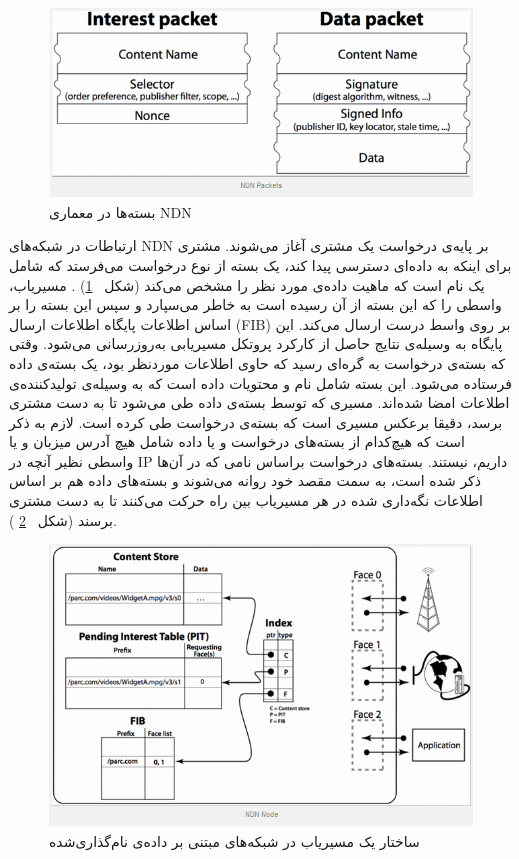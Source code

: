 \begin{figure}[H]
\centering
\includegraphics[scale=0.6]{./resources/figures/3_NDNpackets.png}
\caption{بسته‌ها در معماری NDN}
\label{fig:packets}
\end{figure}




ارتباطات در شبکه‌های NDN بر پایه‌ی درخواست یک مشتری آغاز می‌شوند. مشتری برای اینکه به داده‌ای دسترسی پیدا کند، یک بسته از نوع درخواست می‌فرستد که شامل یک نام است که ماهیت داده‌ی مورد نظر را مشخص می‌کند (شکل
‍‍‍‍~\ref{fig:packets})
. مسیریاب، واسطی را که این بسته از آن رسیده است به خاطر می‌سپارد و سپس این بسته را بر اساس اطلاعات پایگاه اطلاعات ارسال (FIB) بر روی واسط درست ارسال می‌کند. این پایگاه به وسیله‌ی نتایج حاصل از کارکرد پروتکل مسیریابی به‌روزرسانی می‌شود. وقتی که بسته‌ی درخواست به گره‌ای رسید که حاوی اطلاعات موردنظر بود، یک بسته‌ی داده فرستاده می‌شود. این بسته شامل نام و محتویات داده است که به وسیله‌ی تولید‌کننده‌ی اطلاعات امضا شده‌اند. مسیری که توسط بسته‌ی داده طی می‌شود تا به دست مشتری برسد، دقیقا برعکس مسیری است که بسته‌ی درخواست طی کرده است. لازم به ذکر است که هیچ‌کدام از بسته‌‌های درخواست و یا داده شامل هیچ آدرس میزبان و یا واسطی نظیر آنچه در IP  داریم، نیستند. بسته‌های درخواست براساس نامی که در آن‌ها ذکر شده است، به سمت مقصد خود روانه می‌شوند و بسته‌های داده هم بر اساس اطلاعات نگه‌داری شده در هر مسیریاب بین راه حرکت می‌کنند تا به دست مشتری برسند (‌شکل
~\ref{fig:node}
).

\begin{figure}[H]
\centering
\includegraphics[scale=0.9]{./resources/figures/3_NDNnode.png}
\caption{ساختار یک مسیریاب در شبکه‌های مبتنی بر داده‌ی نام‌گذاری‌شده}
\label{fig:node}
\end{figure}

